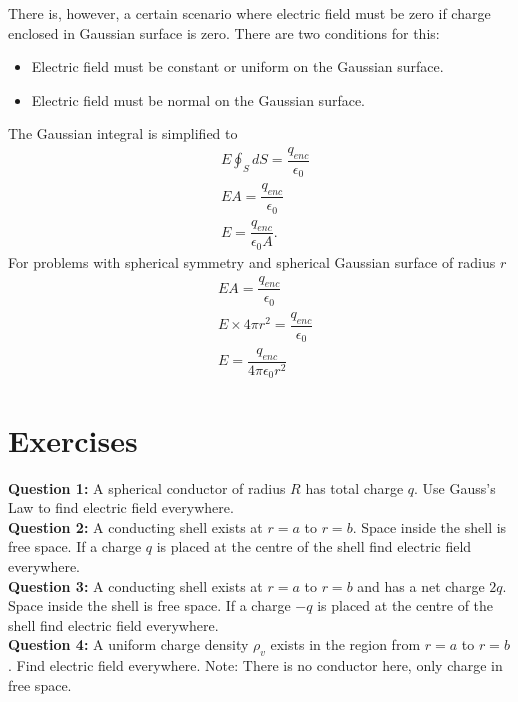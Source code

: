 \documentclass[12pt,a4paper]{article}
\begin{document}
There is, however, a certain scenario where electric field must be zero if charge enclosed in Gaussian surface is zero. There are two conditions for this:
\begin{itemize}
\item Electric field must be constant or uniform on the Gaussian surface.
\item Electric field must be normal on the Gaussian surface.
\end{itemize}
The Gaussian integral is simplified to
\begin{equation}
\begin{split}
&E\oint_{S}dS=\dfrac{q_{enc}}{\epsilon_0}\\
&EA=\dfrac{q_{enc}}{\epsilon_0}\\
&E=\dfrac{q_{enc}}{\epsilon_0A}.
\end{split}
\end{equation}
For problems with spherical symmetry and spherical Gaussian surface of radius $r$
\begin{equation}
\begin{split}
&EA=\dfrac{q_{enc}}{\epsilon_0}\\
&E\times 4\pi r^2=\dfrac{q_{enc}}{\epsilon_0}\\
&E=\dfrac{q_{enc}}{ 4\pi\epsilon_0 r^2}
\end{split}
\end{equation}
\section{Exercises}
\noindent\textbf{Question 1:} A spherical conductor of radius $R$ has total charge $q$. Use Gauss's Law to find electric field everywhere.\\[0.2cm]
\noindent\textbf{Question 2:} A conducting shell exists at $r=a$ to $r=b$. Space inside the shell is free space. If a charge $q$ is placed at the centre of the shell find electric field everywhere.\\[0.2cm]
\noindent\textbf{Question 3:} A conducting shell exists at $r=a$ to $r=b$ and has a net charge $2q$. Space inside the shell is free space. If a charge $-q$ is placed at the centre of the shell find electric field everywhere.\\[0.2cm]
\noindent\textbf{Question 4:} A uniform charge density $\rho_v$ exists in the region from $r=a$ to $r=b$. Find electric field everywhere. Note: There is no conductor here, only charge in free space.\\[0.2cm]
%
%
\end{document}
